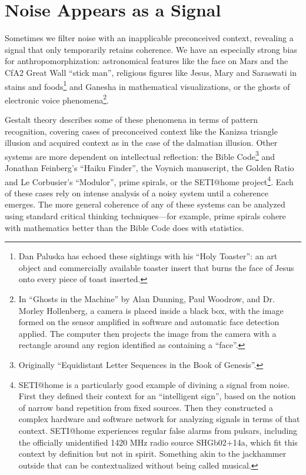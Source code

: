 \documentclass{thesis}
\begin{document}
\section{Noise Appears as a Signal}

Sometimes we filter noise with an inapplicable preconceived context, revealing a signal that only temporarily retains coherence. We have an especially strong bias for anthropomorphization: astronomical features like the face on Mars\cite{brian_dunning_facemars_2008} and the CfA2 Great Wall ``stick man''\cite{de_lapparent_slice_1986}, religious figures like Jesus, Mary and Saraswati in stains and foods\cite{boston.com_religious_????}\footnote{Dan Paluska has echoed these sightings with his ``Holy Toaster''\cite{dan_paluska_holy_2005}: an art object and commercially available toaster insert that burns the face of Jesus onto every piece of toast inserted.} and Ganesha in mathematical visualizations\cite{melinda_green_buddhabrot_1993}, or the ghosts of electronic voice phenomena\footnote{In ``Ghosts in the Machine'' by Alan Dunning, Paul Woodrow, and Dr. Morley Hollenberg\cite{alan_dunning_paul_woodrow_and_morley_hollenberg_einsteins_2008}, a camera is placed inside a black box, with the image formed on the sensor amplified in software and automatic face detection applied. The computer then projects the image from the camera with a rectangle around any region identified as containing a ``face''.}.

Gestalt theory describes some of these phenomena in terms of pattern recognition, covering cases of preconceived context like the Kanizsa triangle illusion\cite{alexander_bogomolny_kanizsa_????} and acquired context as in the case of the dalmatian illusion\cite{michael_bach_dalmatian_2002}. Other systems are more dependent on intellectual reflection: the Bible Code\footnote{Originally ``Equidistant Letter Sequences in the Book of Genesis''\cite{rips_equidistant_1994}.} and Jonathan Feinberg's ``Haiku Finder'', the Voynich manuscript\cite{robin_mckie_secret_2004}, the Golden Ratio\cite{Doczi81}\cite{markowsky_misconceptions_1992} and Le Corbusier's ``Modulor''\cite{padovan_proportion_1999}, prime spirals\cite{michael_m._ross_natural_2007}\cite{weisstein_prime_????}, or the SETI@home project\cite{seti_about_????}\footnote{SETI@home is a particularly good example of divining a signal from noise. First they defined their context for an ``intelligent sign'', based on the notion of narrow band repetition from fixed sources. Then they constructed a complex hardware and software network for analyzing signals in terms of that context. SETI@home experiences regular false alarms from pulsars, including the officially unidentified 1420 MHz radio source SHGb02+14a\cite{eugenie_samuel_reich_mysterious_2004}, which fit this context by definition but not in spirit. Something akin to the jackhammer outside that can be contextualized without being called musical.}. Each of these cases rely on intense analysis of a noisy system until a coherence emerges. The more general coherence of any of these systems can be analyzed using standard critical thinking techniques\cite{Moore07}---for example, prime spirals cohere with mathematics better than the Bible Code does with statistics.
\end{document}
